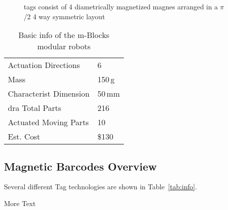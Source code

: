 \begin{figure}[b]
	
	\caption{tags consist of 4 diametrically magnetized
	magnes arranged in a $\pi$ /2 4 way symmetric layout}
	\label{fig:tagDiagram}
\end{figure}

%	

\begin{table}[b]
  \caption{Basic info of the m-Blocks modular robots}

  \begin{tabular}{ p{3.4cm}  p{1.9cm} }
    \hline
    Actuation Directions & 6 \\
    Mass  & 150\,g \\
    Characterist Dimension & 50\,mm \\dra
    Total Parts  & 216 \\
    Actuated Moving Parts  & 10 \\
    Est. Cost & \$130 \\

  \end{tabular}

    \label{tab:hardwareOverview}
\end{table}


\subsection{Magnetic Barcodes Overview}
\label{sec:FlywheelAndBraking}

Several different Tag technologies are shown in Table~\ref{tab:info}.

More Text




